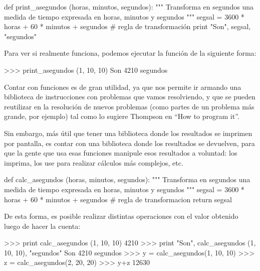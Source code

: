 \begin{codigo-python}
def print_asegundos (horas, minutos, segundos):
    """ Transforma en segundos una medida de tiempo expresada en
        horas, minutos y segundos """
    segsal = 3600 * horas + 60 * minutos + segundos  # regla de transformación
    print "Son", segsal, "segundos"
\end{codigo-python}

Para ver si realmente funciona, podemos ejecutar la función de la siguiente
forma:

\begin{codigo-python-sn}
>>> print_asegundos (1, 10, 10)
Son 4210 segundos
\end{codigo-python-sn}

Contar con funciones es de gran utilidad, ya que nos permite ir armando una
biblioteca de instrucciones con problemas que vamos resolviendo, y que se
pueden reutilizar en la resolución de nuevos problemas (como partes de un
problema más grande, por ejemplo) tal como lo sugiere Thompson en ``How to
program it''.
 
Sin embargo, más útil que tener una biblioteca donde los resultados
se imprimen por pantalla, es contar con una biblioteca donde los
resultados se devuelven, para que la gente que usa esas funciones manipule
esos resultados a voluntad: los imprima, los use para realizar cálculos
más complejos, etc.

\begin{codigo-python}
def calc_asegundos (horas, minutos, segundos):
    """ Transforma en segundos una medida de tiempo expresada en
        horas, minutos y segundos """
    segsal = 3600 * horas + 60 * minutos + segundos  # regla de transformacion
    return segsal
\end{codigo-python}

De esta forma, es posible realizar distintas operaciones con el valor obtenido
luego de hacer la cuenta:

\begin{codigo-python-sn}
>>> print calc_asegundos (1, 10, 10)
4210
>>> print "Son", calc_asegundos (1, 10, 10), "segundos"
Son 4210 segundos
>>> y = calc_asegundos(1, 10, 10)
>>> z = calc_asegundos(2, 20, 20)
>>> y+z
12630
\end{codigo-python-sn}


